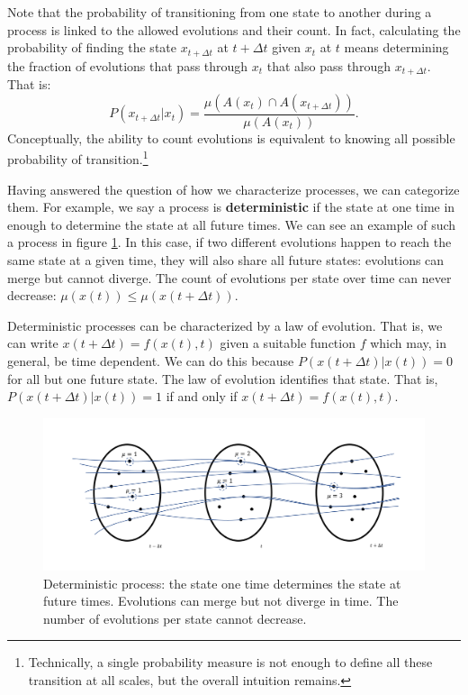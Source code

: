 \documentclass[letterpaper,twocolumn]{article}
\begin{document}
Note that the probability of transitioning from one state to another during a process is linked to the allowed evolutions and their count. In fact, calculating the probability of finding the state $x_{t+\Delta t}$ at $t+\Delta t$ given $x_t$ at $t$ means determining the fraction of evolutions that pass through $x_t$ that also pass through $x_{t+\Delta t}$. That is:
\begin{equation}
	P(x_{t+\Delta t} | x_t) = \frac{\mu(A(x_t) \cap A(x_{t+\Delta t}))}{\mu(A(x_t))}.
\end{equation}
Conceptually, the ability to count evolutions is equivalent to knowing all possible probability of transition.\footnote{Technically, a single probability measure is not enough to define all these transition at all scales, but the overall intuition remains.}

Having answered the question of how we characterize processes, we can categorize them. For example, we say a process is \textbf{deterministic} if the state at one time in enough to determine the state at all future times. We can see an example of such a process in figure \ref{fig_determinism}. In this case, if two different evolutions happen to reach the same state at a given time, they will also share all future states: evolutions can merge but cannot diverge. The count of evolutions per state over time can never decrease: $
\mu(x(t)) \leq \mu(x(t + \Delta t))$.

Deterministic processes can be characterized by a law of evolution. That is, we can write $x(t+\Delta t) = f(x(t), t)$ given a suitable function $f$ which may, in general, be time dependent. We can do this because $P(x(t+\Delta t) | x(t)) = 0$ for all but one future state. The law of evolution identifies that state. That is, $P(x(t+\Delta t) | x(t)) = 1$ if and only if $x(t+\Delta t) = f(x(t), t)$.

\begin{figure}[h!]
	\includegraphics[width=\columnwidth]{images/Slide3.png}
	\caption{Deterministic process: the state one time determines the state at future times. Evolutions can merge but not diverge in time. The number of evolutions per state cannot decrease.}\label{fig_determinism}
\end{figure}
\end{document}
